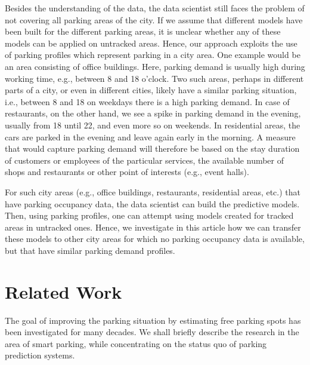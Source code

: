 Besides the understanding of the data, the data scientist still faces the problem of not covering all parking areas of the city. 
If we assume that different models have been built for the different parking areas, it is unclear whether any of these models can be applied on untracked areas. 
Hence, our approach exploits the use of parking profiles which represent parking in a city area. One example would be an area consisting of office buildings. Here, parking demand is usually high during working time, e.g., between 8 and 18 o'clock. Two such areas, perhaps in different parts of a city, or even in different cities, likely have a similar parking situation, i.e., between 8 and 18 on weekdays there is a high parking demand. In case of restaurants, on the other hand, we see a spike in parking demand in the evening, usually from 18 until 22, and even more so on weekends. In residential areas, the cars are parked in the evening and leave again early in the morning. A measure that would capture parking demand will therefore be based on the stay duration of customers or employees of the particular services, the available number of shops and restaurants or other point of interests (e.g., event halls). 

For such city areas (e.g., office buildings, restaurants, residential areas, etc.) that have parking occupancy data, the data scientist can build the predictive models. 
Then, using parking profiles, one can attempt using models created for tracked areas in untracked ones. 
Hence, we investigate in this article how we can transfer these models to other city areas for which no parking occupancy data is available, but that have similar parking demand profiles. 

\section{Related Work}
\label{sec:relwork}
The goal of improving the parking situation by estimating free parking spots has been investigated for many decades. 
We shall briefly describe the research in the area of smart parking, while concentrating on the status quo of parking prediction systems.


